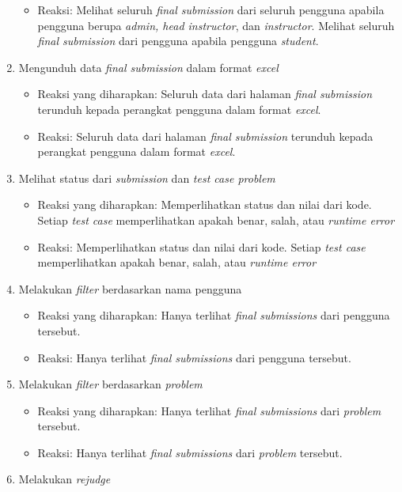 \begin{enumerate}
\begin{itemize}
	 	\item Reaksi: Melihat seluruh \textit{final submission} dari seluruh pengguna apabila pengguna berupa \textit{admin, head instructor}, dan \textit{instructor}. Melihat seluruh \textit{final submission} dari pengguna apabila pengguna \textit{student}.
	 \end{itemize}
	 \item Mengunduh data \textit{final submission} dalam format \textit{excel}
	 \begin{itemize}
	 	\item Reaksi yang diharapkan: Seluruh data dari halaman \textit{final submission} terunduh kepada perangkat pengguna dalam format \textit{excel}.
	 	\item Reaksi: Seluruh data dari halaman \textit{final submission} terunduh kepada perangkat pengguna dalam format \textit{excel}.
	 \end{itemize}
	 \item Melihat status dari \textit{submission} dan \textit{test case problem}
	 \begin{itemize}
	 	\item Reaksi yang diharapkan: Memperlihatkan status dan nilai dari kode. Setiap \textit{test case} memperlihatkan apakah benar, salah, atau \textit{runtime error}
	 	\item Reaksi: Memperlihatkan status dan nilai dari kode. Setiap \textit{test case} memperlihatkan apakah benar, salah, atau \textit{runtime error}
	 \end{itemize}
	 \item Melakukan \textit{filter} berdasarkan nama pengguna
	 \begin{itemize}
	 	\item Reaksi yang diharapkan: Hanya terlihat \textit{final submissions} dari pengguna tersebut.
	 	\item Reaksi: Hanya terlihat \textit{final submissions} dari pengguna tersebut.
	 \end{itemize}
	 \item Melakukan \textit{filter} berdasarkan \textit{problem}
	 \begin{itemize}
	 	\item Reaksi yang diharapkan: Hanya terlihat \textit{final submissions} dari \textit{problem} tersebut.
	 	\item Reaksi: Hanya terlihat \textit{final submissions} dari \textit{problem} tersebut.
	 \end{itemize}
	 \item Melakukan \textit{rejudge}

\end{enumerate}
